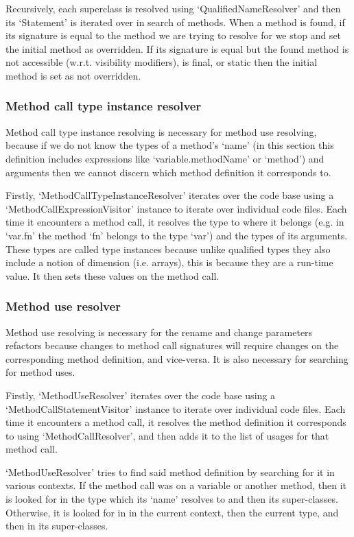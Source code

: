 \documentclass[12pt, letterpaper]{article}
\begin{document}
Recursively, each superclass is resolved using `QualifiedNameResolver' and then its `Statement' is iterated over in search of methods.
When a method is found, if its signature is equal to the method we are trying to resolve for we stop and set the initial method as overridden.
If its signature is equal but the found method is not accessible (w.r.t. visibility modifiers), is final, or static then the initial method is set as not overridden.

\subsubsection{Method call type instance resolver}
Method call type instance resolving is necessary for method use resolving, because if we do not know the types of a method's `name' (in this section this definition includes expressions like `variable.methodName' or `method') and arguments then we cannot discern which method definition it corresponds to.

Firstly, `MethodCallTypeInstanceResolver' iterates over the code base using a `MethodCallExpressionVisitor' instance to iterate over individual code files.
Each time it encounters a method call, it resolves the type to where it belongs (e.g. in `var.fn' the method `fn' belongs to the type `var') and the types of its arguments.
These types are called type instances because unlike qualified types they also include a notion of dimension (i.e. arrays), this is because they are a run-time value.
It then sets these values on the method call.

\subsubsection{Method use resolver}
Method use resolving is necessary for the rename and change parameters refactors because changes to method call signatures will require changes on the corresponding method definition, and vice-versa.
It is also necessary for searching for method uses.

Firstly, `MethodUseResolver' iterates over the code base using a `MethodCallStatementVisitor' instance to iterate over individual code files.
Each time it encounters a method call, it resolves the method definition it corresponds to using `MethodCallResolver', and then adds it to the list of usages for that method call.

`MethodUseResolver' tries to find said method definition by searching for it in various contexts.
If the method call was on a variable or another method, then it is looked for in the type which its `name' resolves to and then its super-classes.
Otherwise, it is looked for in in the current context, then the current type, and then in its super-classes.
\end{document}
